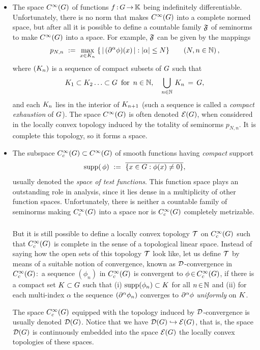 \documentclass[11pt,twoside]{article}
\begin{document}
\begin{itemize}[leftmargin=12pt,itemsep=5pt]
\begin{itemize}[leftmargin=17pt]
\item[(a)]
The space $C^{\infty}(G)$ of functions $f{\,:\,}G {\,\to\,} {\mathbb{K}}$ being indefinitely differentiable.
Unfortunately,
there is no norm that makes $C^{\infty}(G)$ into a complete normed space,
but after all it is possible to define a countable family $\mathfrak{F}$
of seminorms to make $C^{\infty}(G)$ into a {\FRECHET} space.
For example,
$\mathfrak{F}$ can be given by the mappings
\[
p_{N,n} \, \eqdef \,
\max_{x \in \compK_n} \;
\{ \, \abs{\, (\PA \phi)(x) \,} : \abs{\alpha} \leq N \}
\quad \quad (N,n \in \N)\,,
\]
where $({K}_n)$ is a sequence of compact subsets of $G$
such that
\[
{K}_1 \subset {K}_2 \ldots \subset G \, \mbox{ for } \, n \in {\mathbb{N}},
\quad
\bigcup_{n \in {\mathbb{N}}} \, {K}_n \,=\, G,
\]
and each ${K}_n$ lies in the interior of ${K}_{n+1}$
(such a sequence is called a \textit{compact exhaustion} of $G$).
The space $C^{\infty}(G)$ is often denoted ${\mathcal{E}}(G)$,
when considered in the locally convex topology induced by the totality
of seminorms $p_{N,n}$.
It is complete {\wrt} this topology,
so it forms a {\FRECHET} space.

\item[(b)]
The subspace $C_c^{\infty}(G) \subset C^{\infty}(G)$ of smooth functions
having \textit{compact} support
\[
\operatorname{supp}(\,\phi) \, \,:=\, \, \overline{\{x \in G: \phi(x) \neq 0\}},
\]
usually denoted the \textit{space of test functions}.
This function space plays an outstanding role in analysis,
since it lies dense in a multiplicity of other function spaces.
Unfortunately,
there is neither a countable family of seminorms
making $C_c^{\infty}(G)$ into a {\FRECHET} space nor is $C_c^{\infty}(G)$ completely metrizable.

\subparagraph{}
But it is still possible to define a locally convex topology $\mathcal{T}$ on $C_c^{\infty}(G)$
such that $C_c^{\infty}(G)$ is complete in the sense of a topological linear space.
Instead of saying how the open sets of this topology $\mathcal{T}$ look like,
let us define $\mathcal{T}$ by means of a suitable notion of convergence,
known as ${\mathcal{D}}$-convergence in $C_c^{\infty}(G)$:\,
a sequence $(\phi_n)$ in $C_c^{\infty}(G)$ is convergent to $\phi {\,\in\,} C_c^{\infty}(G)$,
if there is a compact set ${K} \subset G$
such that
(i)  $\operatorname{supp}(\phi_n) \subset {K}$ for all $n {\,\in\,} {\mathbb{N}}$ and
(ii) for each multi-index $\alpha$ the sequence $(\partial^{\alpha} \phi_n)$
     converges to $\partial^{\alpha} \phi$ \textit{uniformly} on ${K}$.

The space $C_c^{\infty}(G)$ equipped with the topology
induced by ${\mathcal{D}}$-convergence is usually denoted ${\mathcal{D}}(G)$.
Notice
that we have ${\mathcal{D}}(G) \hookrightarrow {\mathcal{E}}(G)$,
that is,
the space ${\mathcal{D}}(G)$ is continuously embedded into the space ${\mathcal{E}}(G)$
{\wrt} the locally convex topologies of these spaces.


\end{itemize}
\end{itemize}
\end{document}
